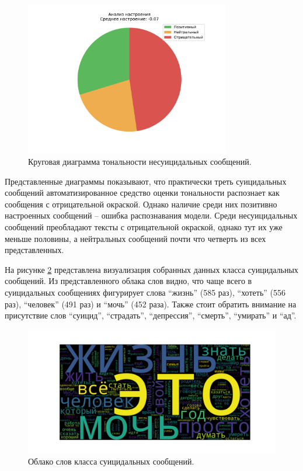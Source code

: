 \begin{figure}[H]
	\centering
	\includegraphics[width=0.8\textwidth]{inc/plots/sentiments_non_suicidal.pdf}
	\caption{ Круговая диаграмма тональности несуицидальных сообщений. }
	\label{img:sentiments2}
\end{figure}

Представленные диаграммы показывают, что практически треть суицидальных сообщений автоматизированное средство оценки тональности распознает как сообщения с отрицательной окраской. Однако наличие среди них позитивно настроенных сообщений -- ошибка распознавания модели. Среди несуицидальных сообщений преобладают тексты с отрицательной окраской, однако тут их уже меньше половины, а нейтральных сообщений почти что четверть из всех представленных. 

На рисунке \ref{img:cloud1} представлена визуализация собранных данных класса суицидальных сообщений. Из представленного облака слов видно, что чаще всего в суицидальных сообщениях фигурирует слова ``жизнь'' (585 раз), ``хотеть'' (556 раз), ``человек'' (491 раз) и ``мочь'' (452 раза). Также стоит обратить внимание на присутствие слов ``суицид'', ``страдать'', ``депрессия'', ``смерть'', ``умирать'' и ``ад''.

\begin{figure}[H]
	\centering
	\includegraphics[width=\textwidth]{inc/cloudSuicidal.pdf}
	\caption{ Облако слов класса суицидальных сообщений. }
	\label{img:cloud1}
\end{figure}

